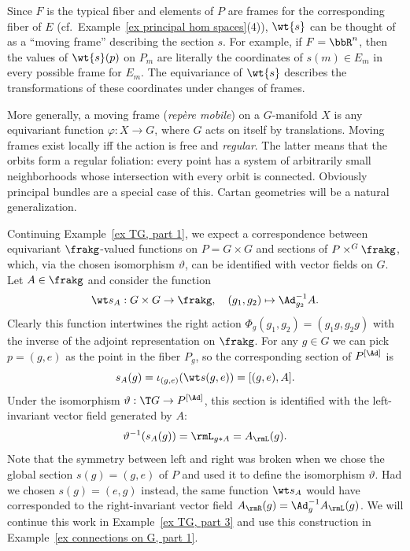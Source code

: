 \begin{rem}
    Since $F$ is the typical fiber and elements of $P$ are frames for the corresponding fiber of $E$ (cf.\ Example~\ref{ex principal hom spaces}(4)), $\wt{s}$ can be thought of as a ``moving frame'' describing the section $s$. For example, if $F=\bbR^n$, then the values of $\wt{s}(p)$ on $P_m$ are literally the coordinates of $s(m)\in E_m$ in every possible frame for $E_m$. The equivariance of $\wt{s}$ describes the transformations of these coordinates under changes of frames.

    More generally, a moving frame (\emph{rep\`ere mobile})  on a $G$-manifold $X$ is any equivariant function $\varphi:X\to G$, where $G$ acts on itself by translations. Moving frames exist locally iff the action is free and \emph{regular}. The latter means that the orbits form a regular foliation: every point has a system of arbitrarily small neighborhoods whose intersection with every orbit is connected. Obviously principal bundles are a special case of this. Cartan geometries will be a natural generalization.
\end{rem}

\begin{example}\label{ex TG, part 2}
    Continuing Example~\ref{ex TG, part 1}, we expect a correspondence between equivariant $\frakg$-valued functions on $P=G\times G$ and sections of $P\times^G \frakg$, which, via the chosen isomorphism $\vartheta$, can be identified with vector fields on $G$. Let $A\in\frakg$ and consider the function
    \[\wt s_A:G\times G\to \frakg,\quad (g_1,g_2)\mapsto \Ad_{g_2}^{-1}A.\]
    Clearly this function intertwines the right action $\Phi_g(g_1,g_2)=(g_1g,g_2g)$ with the inverse of the adjoint representation on $\frakg$. For any $g\in G$ we can pick $p=(g,e)$ as the point in the fiber $P_g$, so the corresponding section of $P^{[\Ad]}$ is 
    \[s_A(g)=\iota_{(g,e)}(\wt s(g,e))=[(g,e),A].\]
    Under the isomorphism $\vartheta:\T G\to P^{[\Ad]}$, this section is identified with the left-invariant vector field generated by $A$:
    \[\vartheta^{-1}(s_A(g))=\rmL_{g\ast A}=A_\rmL(g).\]
    Note that the symmetry between left and right was broken when we chose the global section $s(g)=(g,e)$ of $P$ and used it to define the isomorphism $\vartheta$. Had we chosen $s(g)=(e,g)$ instead, the same function $\wt s_A$ would have corresponded to the right-invariant vector field $A_\rmR(g)=\Ad_g^{-1} A_\rmL(g)$. We will continue this work in Example~\ref{ex TG, part 3} and use this construction in Example~\ref{ex connections on G, part 1}.
\end{example}






